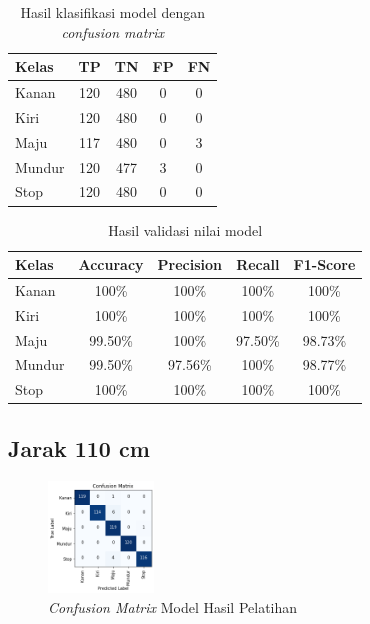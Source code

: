 \begin{longtable}{|l|c|c|c|c|}
  \caption{Hasil klasifikasi model dengan \emph{confusion matrix}}
  \label{tb:cm_model5} \\
  \hline
  \rowcolor[HTML]{C0C0C0} 
  \textbf{Kelas} & \textbf{TP} & \textbf{TN} & \textbf{FP} & \textbf{FN} \\ \hline
  Kanan    & 120          & 480         & 0           & 0           \\ \hline
  Kiri      & 120          & 480         & 0           & 0           \\ \hline
  Maju      & 117          & 480         & 0           & 3           \\ \hline
  Mundur     & 120          & 477         & 3           & 0           \\ \hline
  Stop  & 120          & 480         & 0           & 0           \\ \hline
\end{longtable}

\begin{longtable}{|l|c|c|c|c|}
  \caption{Hasil validasi nilai model}
  \label{tb:vs_model5} \\
  \hline
  \rowcolor[HTML]{C0C0C0} 
  \textbf{Kelas} & \textbf{Accuracy} & \textbf{Precision} & \textbf{Recall} & \textbf{F1-Score} \\ \hline
  Kanan    & 100\%            & 100\%             & 100\%           & 100\%            \\ \hline
  Kiri     & 100\%          & 100\%           & 100\%           & 100\%           \\ \hline
  Maju      & 99.50\%          & 100\%           & 97.50\%          & 98.73\%          \\ \hline
  Mundur     & 99.50\%            & 97.56\%             & 100\%           & 98.77\%            \\ \hline
  Stop  & 100\%            & 100\%             & 100\%           & 100\%            \\ \hline
\end{longtable}

\subsection{Jarak 110 cm}

\begin{figure} [ht] \centering
  \includegraphics[width=0.25\textwidth]{gambar/bab4/model5 (30cm)/110cm/matrix.png}
  \caption{\emph{Confusion Matrix} Model Hasil Pelatihan}
  \label{fig:matrix6}
\end{figure}

